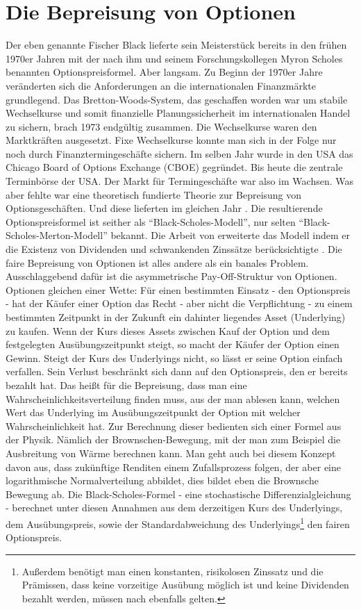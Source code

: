 \section{Die Bepreisung von Optionen}
\label{Optionen}

Der eben genannte Fischer Black lieferte sein Meisterstück bereits in den frühen 1970er Jahren mit der nach ihm und seinem Forschungskollegen Myron Scholes benannten Optionspreisformel. Aber langsam. Zu Beginn der 1970er Jahre veränderten sich die Anforderungen an die internationalen Finanzmärkte grundlegend. Das Bretton-Woods-System, das geschaffen worden war um stabile Wechselkurse und somit finanzielle Planungssicherheit im internationalen Handel zu sichern, brach 1973 endgültig zusammen. Die Wechselkurse waren den Marktkräften ausgesetzt. Fixe Wechselkurse konnte man sich in der Folge nur noch durch Finanztermingeschäfte sichern. Im selben Jahr wurde in den USA das Chicago Board of Options Exchange (CBOE) gegründet. Bis heute die zentrale Terminbörse der USA. Der Markt für Termingeschäfte war also im Wachsen. Was aber fehlte war eine theoretisch fundierte Theorie zur Bepreisung von Optionsgeschäften. Und diese lieferten im gleichen Jahr \textcite{Black1973}. Die resultierende Optionspreisformel ist seither als "`Black-Scholes-Modell"', nur selten "`Black-Scholes-Merton-Modell"' bekannt. Die Arbeit von \textcite{Merton1973} erweiterte das Modell indem er die Existenz von Dividenden und schwankenden Zinssätze berücksichtigte \parencite{Scholes1997}.  Die faire Bepreisung von Optionen ist alles andere als ein banales Problem. Ausschlaggebend dafür ist die asymmetrische Pay-Off-Struktur von Optionen. Optionen gleichen einer Wette: Für einen bestimmten Einsatz - den Optionspreis - hat der Käufer einer Option das Recht - aber nicht die Verpflichtung - zu einem bestimmten Zeitpunkt in der Zukunft ein dahinter liegendes Asset (Underlying) zu kaufen. Wenn der Kurs dieses Assets zwischen Kauf der Option und dem festgelegten Ausübungszeitpunkt steigt, so macht der Käufer der Option einen Gewinn. Steigt der Kurs des Underlyings nicht, so lässt er seine Option einfach verfallen. Sein Verlust beschränkt sich dann auf den Optionspreis, den er bereits bezahlt hat.
Das heißt für die Bepreisung, dass man eine Wahrscheinlichkeitsverteilung finden muss, aus der man ablesen kann, welchen Wert das Underlying im Ausübungszeitpunkt der Option mit welcher Wahrscheinlichkeit hat. Zur Berechnung dieser bedienten sich \textcite{Black1973} einer Formel aus der Physik. Nämlich der Brownschen-Bewegung, mit der man zum Beispiel die Ausbreitung von Wärme berechnen kann. Man geht auch bei diesem Konzept davon aus, dass zukünftige Renditen einem Zufallsprozess folgen, der aber eine logarithmische Normalverteilung abbildet, dies bildet eben die Brownsche Bewegung ab. Die Black-Scholes-Formel - eine stochastische Differenzialgleichung - berechnet unter diesen Annahmen aus dem derzeitigen Kurs des Underlyings, dem Ausübungspreis, sowie der Standardabweichung des Underlyings\footnote{Außerdem benötigt man einen konstanten, risikolosen Zinssatz und die Prämissen, dass keine vorzeitige Ausübung möglich ist und keine Dividenden bezahlt werden, müssen nach \textcite{Black1973} ebenfalls gelten.} den fairen Optionspreis.
